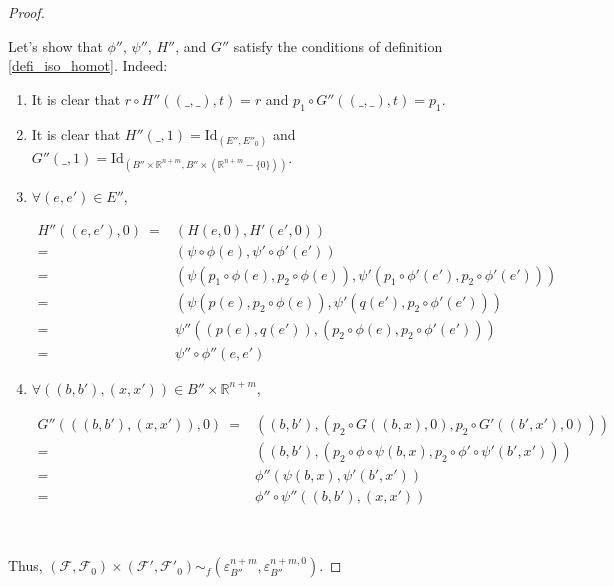 \documentclass[12pt,oneside]{book}
\newcommand{\R}{\mathbb{R}}
\begin{document}
\begin{proof}
        \
        
        Let's show that $\phi''$, $\psi''$, $H''$, and $G''$ satisfy the conditions of definition \ref{defi_iso_homot}. Indeed:
        
        \begin{enumerate}
            \item It is clear that $r\circ H''((\_,\_),t)=r$ and $p_{1}\circ G''((\_,\_),t)=p_{1}$.
            \item It is clear that $H''(\_,1)=\text{Id}_{(E'',E''_{0})}$ and $G''(\_,1)=\text{Id}_{(B''\times \R^{n+m},B''\times (\R^{n+m}-\{ 0 \}))}$.
            \item $\forall (e,e')\in E''$,
                
                    $\begin{array}{rl}
                        H''((e,e'),0) \ = & (H(e,0),H'(e',0)) \\
                        = & (\psi\circ\phi(e),\psi'\circ\phi'(e')) \\
                        = & (\psi(p_{1}\circ\phi(e),p_{2}\circ\phi(e)),\psi'(p_{1}\circ\phi'(e'),p_{2}\circ\phi'(e'))) \\
                        = & (\psi(p(e),p_{2}\circ\phi(e)),\psi'(q(e'),p_{2}\circ\phi'(e'))) \\
                        = & \psi''((p(e),q(e')),(p_{2}\circ\phi(e),p_{2}\circ\phi'(e'))) \\
                        = & \psi''\circ\phi''(e,e')
                    \end{array}$
            \item $\forall ((b,b'),(x,x'))\in B''\times\R^{n+m}$,
            
                    $\begin{array}{rl}
                        G''(((b,b'),(x,x')),0) \ = & ((b,b'),(p_{2}\circ G((b,x),0),p_{2}\circ G'((b',x'),0))) \\
                        = & ((b,b'),(p_{2}\circ\phi\circ\psi(b,x),p_{2}\circ\phi'\circ\psi'(b',x'))) \\
                        = & \phi''(\psi(b,x),\psi'(b',x')) \\
                        = & \phi''\circ\psi''((b,b'),(x,x'))
                    \end{array}$
        \end{enumerate}

        \
        
        Thus, 
        $(\mathcal{F},\mathcal{F}_{0})\times (\mathcal{F'},\mathcal{F'}_{0}) \sim_{f} (\varepsilon^{n+m}_{B''},\varepsilon^{n+m,0}_{B''})$.
    \end{proof}
\end{document}
